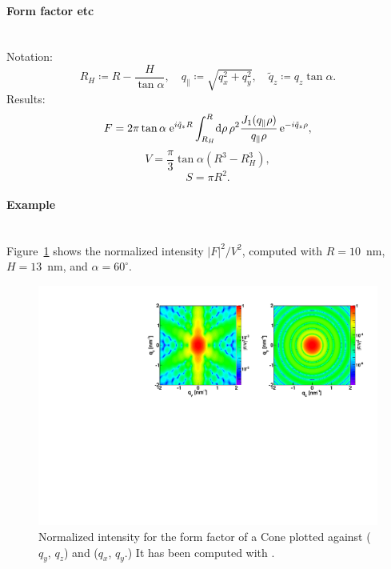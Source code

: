 \paragraph{Form factor etc}\strut\\
Notation:
\begin{equation*}
  R_H \coloneqq R-\dfrac{H}{\tan \alpha}, \quad
  q_{\parallel} \coloneqq \sqrt{q_x^2+ q_y^2}, \quad
  \tilde{q}_z \coloneqq q_z \tan\alpha.
\end{equation*}
Results:
\begin{equation*}
  F = 2\pi \tan\alpha\; \text{e}^{i\tilde{q}_z R}
      \int_{R_H}^R \!\text{d}\rho\, \rho^2
        \frac{J_1(q_{\parallel}\rho)}{q_{\parallel}\rho}\,\text{e}^{-i\tilde{q}_z \rho},
\end{equation*}
\begin{equation*}
  V = \dfrac{\pi}{3}\tan\alpha  \left( R^3 - R_H^3\right),
\end{equation*}
\begin{equation*}
  S=\pi R^2.
\end{equation*}

\paragraph{Example}\strut\\
Figure~\ref{fig:FFConeEx} shows the normalized intensity
$|F|^2/V^2$, computed with $R=10$~nm, $H=13$~nm, and $\alpha=60^{\circ}$.
\begin{figure}[h]
\begin{center}
\includegraphics[angle=-90,width=\textwidth]{fig/ff/figffcone.pdf}
\end{center}
\caption{Normalized intensity for the form factor of a Cone plotted against ($q_y$, $q_z$) and ($q_x$, $q_y$.) It
  has been  computed with .}
\label{fig:FFConeEx}
\end{figure}

